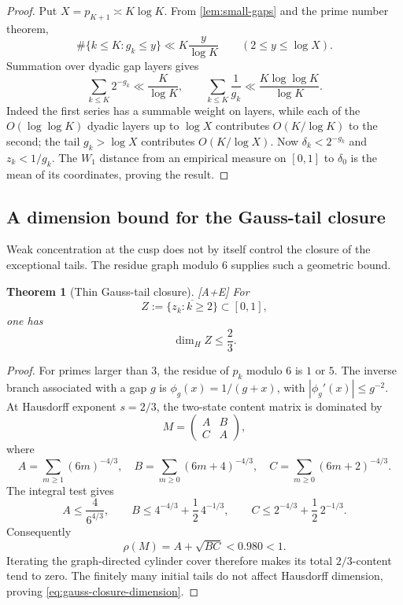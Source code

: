 \documentclass[11pt]{article}
\newtheorem{theorem}{Theorem}[section]
\theoremstyle{definition}
\theoremstyle{remark}
\newcommand{\status}[1]{\textnormal{\textcolor{accent}{\footnotesize[#1]}}}
\begin{document}
\begin{proof}
Put $X=p_{K+1}\asymp K\log K$.  From \cref{lem:small-gaps} and the prime number
theorem,
\[
 \#\{k\le K:g_k\le y\}\ll K\frac{y}{\log K}
 \qquad(2\le y\le\log X).
\]
Summation over dyadic gap layers gives
\[
 \sum_{k\le K}2^{-g_k}\ll\frac K{\log K},
 \qquad
 \sum_{k\le K}\frac1{g_k}\ll
 \frac{K\log\log K}{\log K}.
\]
Indeed the first series has a summable weight on layers, while each of the
$O(\log\log K)$ dyadic layers up to $\log X$ contributes $O(K/\log K)$ to the second;
the tail $g_k>\log X$ contributes $O(K/\log X)$.  Now
$\delta_k<2^{-g_k}$ and $z_k<1/g_k$.  The $W_1$ distance from an empirical measure on
$[0,1]$ to $\delta_0$ is the mean of its coordinates, proving the result.
\end{proof}

\subsection{A dimension bound for the Gauss-tail closure}

Weak concentration at the cusp does not by itself control the closure of the exceptional
tails.  The residue graph modulo $6$ supplies such a geometric bound.

\begin{theorem}[Thin Gauss-tail closure]\label{thm:gauss-closure-dimension}
\status{A+E}
For
\[
 Z:=\overline{\{z_k:k\ge2\}}\subset[0,1],
\]
one has
\begin{equation}\label{eq:gauss-closure-dimension}
 \dim_H Z\le\frac23.
\end{equation}
\end{theorem}

\begin{proof}
For primes larger than $3$, the residue of $p_k$ modulo $6$ is $1$ or $5$.
The inverse branch associated with a gap $g$ is
$\phi_g(x)=1/(g+x)$, with $|\phi_g'(x)|\le g^{-2}$.  At Hausdorff exponent
$s=2/3$, the two-state content matrix is dominated by
\[
 M=\begin{pmatrix}A&B\\ C&A\end{pmatrix},
\]
where
\[
 A=\sum_{m\ge1}(6m)^{-4/3},\quad
 B=\sum_{m\ge0}(6m+4)^{-4/3},\quad
 C=\sum_{m\ge0}(6m+2)^{-4/3}.
\]
The integral test gives
\[
 A\le\frac4{6^{4/3}},\qquad
 B\le4^{-4/3}+\frac12\,4^{-1/3},\qquad
 C\le2^{-4/3}+\frac12\,2^{-1/3}.
\]
Consequently
\[
 \rho(M)=A+\sqrt{BC}<0.980<1.
\]
Iterating the graph-directed cylinder cover therefore makes its total $2/3$-content
tend to zero.  The finitely many initial tails do not affect Hausdorff dimension, proving
\eqref{eq:gauss-closure-dimension}.
\end{proof}
\end{document}

